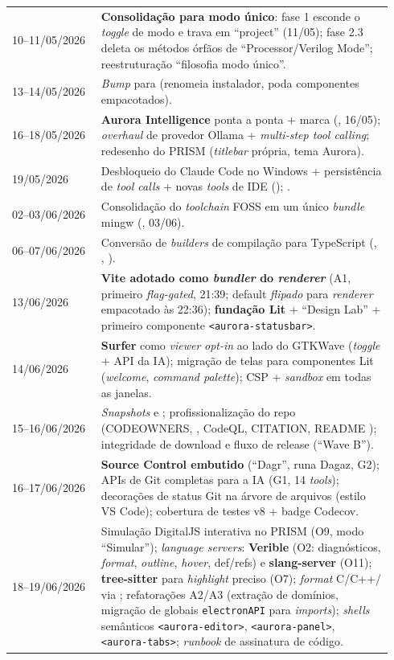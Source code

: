 \begin{longtable}{P{0.22\linewidth} Q{0.72\linewidth}}
  10--11/05/2026 & \textbf{Consolidação para modo único}: fase 1 esconde o \emph{toggle} de modo e trava em \enquote{project} (11/05); fase 2.3 deleta os métodos órfãos de \enquote{Processor/Verilog Mode}; reestruturação \enquote{filosofia modo único}. \\
  13--14/05/2026 & \emph{Bump} para  (renomeia instalador, poda componentes empacotados). \\
  16--18/05/2026 & \textbf{Aurora Intelligence} ponta a ponta + marca (, 16/05); \emph{overhaul} de provedor Ollama + \emph{multi-step tool calling}; redesenho do PRISM (\emph{titlebar} própria, tema Aurora). \\
  19/05/2026 & Desbloqueio do Claude Code no Windows + persistência de \emph{tool calls} + novas \emph{tools} de IDE (); . \\
  02--03/06/2026 & Consolidação do \emph{toolchain} FOSS em um único \emph{bundle} mingw (, 03/06). \\
  06--07/06/2026 & Conversão de \emph{builders} de compilação para TypeScript (, , ). \\
  13/06/2026 & \textbf{Vite adotado como \emph{bundler} do \emph{renderer}} (A1, primeiro \emph{flag-gated}, 21:39; default \emph{flipado} para \emph{renderer} empacotado às 22:36); \textbf{fundação Lit} + \enquote{Design Lab} + primeiro componente \lstinline|<aurora-statusbar>|. \\
  14/06/2026 & \textbf{Surfer} como \emph{viewer} \emph{opt-in} ao lado do GTKWave (\emph{toggle} + API da IA); migração de telas para componentes Lit (\emph{welcome}, \emph{command palette}); CSP + \emph{sandbox} em todas as janelas. \\
  15--16/06/2026 & \emph{Snapshots}  e ; profissionalização do repo (CODEOWNERS, , CodeQL, CITATION, README \textrightarrow{} ); integridade de download e fluxo de release (\enquote{Wave B}). \\
  16--17/06/2026 & \textbf{Source Control embutido} (\enquote{Dagr}, runa Dagaz, G2); APIs de Git completas para a IA (G1, 14 \emph{tools}); decorações de status Git na árvore de arquivos (estilo VS Code); cobertura de testes  v8 + badge Codecov. \\
  18--19/06/2026 & Simulação DigitalJS interativa no PRISM (O9, modo \enquote{Simular}); \emph{language servers}: \textbf{Verible} (O2: diagnósticos, \emph{format}, \emph{outline}, \emph{hover}, def/refs) e \textbf{slang-server} (O11); \textbf{tree-sitter} para \emph{highlight} preciso (O7); \emph{format} C/C++/\cmm{} via ; refatorações A2/A3 (extração de domínios, migração de globais \lstinline|electronAPI| para \emph{imports}); \emph{shells} semânticos \lstinline|<aurora-editor>|, \lstinline|<aurora-panel>|, \lstinline|<aurora-tabs>|; \emph{runbook} de assinatura de código. \\
  \bottomrule
\end{longtable}

